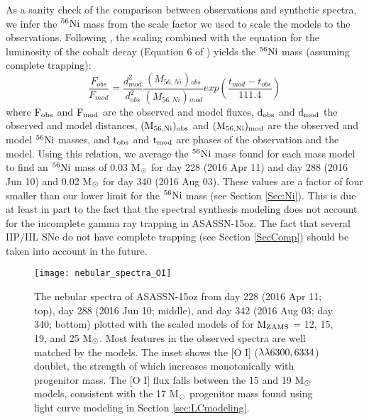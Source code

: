 \documentclass[a4paper,fleqn,usenatbib]{mnras}
\newcommand{\msun}{M$\rm{_{\odot}}$ }
\begin{document}
As a sanity check of the comparison between observations and synthetic spectra, we infer the $\rm{{}^{56}Ni}$ mass from the scale factor we used to scale the models to the observations.
Following \citet{2018jerkstrand}, the scaling combined with the equation for the luminosity of the cobalt decay (Equation 6 of \citealt{2012jerkstrand}) yields the $\rm{{}^{56}Ni}$ mass (assuming complete trapping): 
\begin{equation}
\frac{F_{obs}}{F_{mod}} = \frac{d_{mod}^{2}}{d_{obs}^{2}}\frac{(M_{56,Ni}){}_{obs}}{(M_{56, Ni}){}_{mod}}exp\left(\frac{t_{mod} - t_{obs}}{111.4}\right)
\end{equation}
where $\rm{F_{obs}}$ and $\rm{F_{mod}}$ are the observed and model fluxes, $\rm{d_{obs}}$ and $\rm{d_{mod}}$ the observed and model distances, $\rm{(M_{56, Ni}){}_{obs}}$ and $\rm{(M_{56, Ni}){}_{mod}}$ are the observed and model $\rm{{}^{56}Ni}$ masses, and $\rm{t_{obs}}$ and $\rm{t_{mod}}$ are phases of the observation and the model.
Using this relation, we average the $\rm{{}^{56}Ni}$ mass found for each mass model to find an $\rm{{}^{56}Ni}$ mass of 0.03 \msun for day 228 (2016 Apr 11) and day 288 (2016 Jun 10) and 0.02 \msun for day 340 (2016 Aug 03).
These values are a factor of four smaller than our lower limit for the $\rm{{}^{56}Ni}$ mass (see Section \ref{Sec:Ni}).
This is due at least in part to the fact that the spectral synthesis modeling does not account for the incomplete gamma ray trapping in ASASSN-15oz.
The fact that several IIP/IIL SNe do not have complete trapping (see Section \ref{SecComp}) should be taken into account in the future.
\begin{figure}
\begin{center}
\texttt{[image: nebular\_spectra\_OI]} %
\caption{The nebular spectra of ASASSN-15oz from day 228 (2016 Apr 11; top), day 288 (2016 Jun 10; middle), and day 342 (2016 Aug 03; day 340; bottom) plotted with the scaled models of \citet{2014jerkstrand} for $\rm{M_{ZAMS}}$ = 12, 15, 19, and 25 M$\rm{_{\odot}}$. 
Most features in the observed spectra are well matched by the models. 
The inset shows the [O I] ($\rm{\lambda\lambda6300, 6334}$) doublet, the strength of which increases monotonically with progenitor mass. 
The [O I] flux falls between the 15 and 19 M$\rm{_{\odot}}$ models, consistent with the 17 M$\rm{_{\odot}}$ progenitor mass found using light curve modeling in Section \ref{sec:LCmodeling}.}
\label{fig:neb}
\end{center}
\end{figure}
\end{document}
